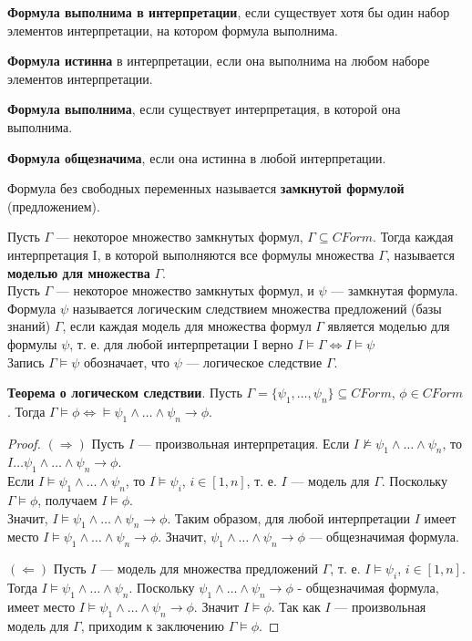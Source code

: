 \textbf{Формула выполнима в интерпретации}, если существует хотя бы один набор элементов интерпретации, на котором формула выполнима.

\textbf{Формула истинна} в интерпретации, если она выполнима на любом наборе элементов интерпретации.

\textbf{Формула выполнима}, если существует интерпретация, в которой она выполнима.

\textbf{Формула общезначима}, если она истинна в любой интерпретации.

Формула без свободных переменных называется \textbf{замкнутой формулой} (предложением).

Пусть $\Gamma$ — некоторое множество замкнутых формул, $\Gamma \subseteq CForm$. Тогда каждая интерпретация I, в которой выполняются все формулы множества $\Gamma$, называется \textbf{моделью для множества} $\Gamma$. \\

Пусть $\Gamma$ — некоторое множество замкнутых формул, и $\psi$ --- замкнутая формула. Формула $\psi$ называется логическим следствием множества предложений (базы знаний) $\Gamma$, если каждая модель для множества формул $\Gamma$ является моделью для формулы $\psi$, т. е. для любой интерпретации I верно $I \models \Gamma \Longleftrightarrow I \models \psi$ \\
Запись $\Gamma \models \psi$ обозначает, что $\psi$ --- логическое следствие $\Gamma$.

\textbf{Теорема о логическом следствии}.
Пусть $\Gamma = \{\psi_1,\ldots,\psi_n\} \subseteq CForm $, $\phi \in CForm $. Тогда $\Gamma \models \phi \iff  \models \psi_1 \wedge \ldots \wedge \psi_{n} \longrightarrow \phi$.

\begin{proof}
$(\Rightarrow)$ Пусть $I$ — произвольная интерпретация. 
Если $I \nvDash \psi_1 \wedge \ldots \wedge \psi_{n}$, то $I \ldots \psi_1 \wedge \ldots \wedge \psi_{n} \longrightarrow \phi$. \\
Если $I \models \psi_1 \wedge \ldots \wedge \psi_{n}$, то $I \models \psi_i$, $i \in [1,n]$, т. е. $I$ --- модель для $\Gamma$. Поскольку $\Gamma \models \phi$, получаем $I \models \phi$. \\
Значит, $I \models \psi_1 \wedge \ldots \wedge \psi_{n} \longrightarrow \phi$.
Таким образом, для любой интерпретации $I$ имеет место $I \models \psi_1 \wedge \ldots \wedge \psi_{n} \longrightarrow \phi$.
Значит, $\psi_1 \wedge \ldots \wedge \psi_{n} \longrightarrow \phi$ --- общезначимая формула.

$(\Leftarrow)$ Пусть $I$ — модель для множества предложений $\Gamma$, т. е. $I \models \psi_i$, $i \in [1,n]$. Тогда $I \models \psi_1 \wedge \ldots \wedge \psi_{n}$. Поскольку $\psi_1 \wedge \ldots \wedge \psi_{n} \longrightarrow \phi$ - общезначимая формула, имеет место $I \models \psi_1 \wedge \ldots \wedge \psi_{n} \longrightarrow \phi$. Значит $I \models \phi$. Так как $I$ --- произвольная модель для $\Gamma$, приходим к заключению $\Gamma \models \phi$.
\end{proof}

